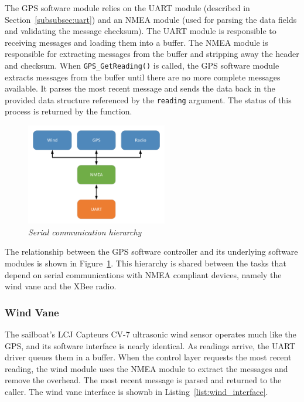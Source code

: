 \documentclass[12pt]{article}
\begin{document}
The GPS software module relies on the UART module (described in Section~\ref{subsubsec:uart}) and an NMEA module (used for parsing the data fields and validating the message checksum). The UART module is responsible to receiving messages and loading them into a buffer. The NMEA module is responsible for extracting messages from the buffer and stripping away the header and checksum. When \texttt{GPS\_GetReading()} is called, the GPS software module extracts messages from the buffer until there are no more complete messages available. It parses the most recent message and sends the data back in the provided data structure referenced by the \texttt{reading} argument. The status of this process is returned by the function.

\begin{figure}
	\centering
	\includegraphics[width=0.55\textwidth]{figures/comm_stack.pdf}
	\caption[Serial communication hierarchy]{\textsl{Serial communication hierarchy}}
	\label{fig:comm_stack}
\end{figure}

The relationship between the GPS software controller and its underlying software modules is shown in Figure~\ref{fig:comm_stack}. This hierarchy is shared between the tasks that depend on serial communications with NMEA compliant devices, namely the wind vane and the XBee radio.

\subsubsection{Wind Vane}
The sailboat's LCJ Capteurs CV-7 ultrasonic wind sensor operates much like the GPS, and its software interface is nearly identical. As readings arrive, the UART driver queues them in a buffer. When the control layer requests the most recent reading, the wind module uses the NMEA module to extract the messages and remove the overhead. The most recent message is parsed and returned to the caller. The wind vane interface is shownb in Listing~\ref{list:wind_interface}.
\end{document}
